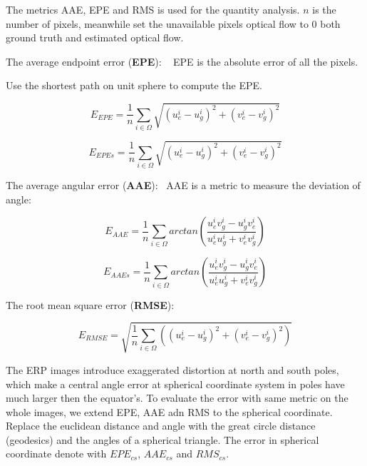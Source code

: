 The metrics AAE, EPE and RMS is used for the quantity analysis.
$n$ is the number of pixels, meanwhile set the unavailable pixels optical flow to 0 both ground truth and estimated optical flow.

The average endpoint error (\textbf{EPE}):  ~\cite{BakerSLRBS2011}
EPE is the absolute error of all the pixels.

Use the shortest path on unit sphere to compute the EPE.

\begin{equation}\label{equ_exp_epe}
	E_{EPE} = \frac{1}{n} \sum_{i \in \Omega}\sqrt{(u_e^i - u_g^i)^2 + (v_e^i - v_g^i)^2}
\end{equation}

\begin{equation}\label{equ_exp_epe_sp}
	E_{EPEs} = \frac{1}{n} \sum_{i \in \Omega}\sqrt{(u_e^i - u_g^i)^2 + (v_e^i - v_g^i)^2}
\end{equation}

The average angular error (\textbf{AAE}):~\cite{??}
AAE is a metric to measure the deviation of angle:

\begin{equation}\label{equ_exp_aae}
	E_{AAE} = \frac{1}{n} \sum_{i \in \Omega}arctan(\frac{u^i_e v^i_g - u^i_g v^i_e}{u^i_e u^i_g + v^i_e v^i_g})
\end{equation}

\begin{equation}\label{equ_exp_aae_sp}
	E_{AAEs} = \frac{1}{n} \sum_{i \in \Omega}arctan(\frac{u^i_e v^i_g - u^i_g v^i_e}{u^i_e u^i_g + v^i_e v^i_g})
\end{equation}

The root mean square error (\textbf{RMSE}):~\cite{??}


\begin{equation}\label{equ_exp_rmse}
	E_{RMSE} = \sqrt{\frac{1}{n} \sum_{i \in \Omega}((u_e^i - u_g^i)^2 + (v_e^i - v_g^i)^2)}
\end{equation}

The ERP images introduce exaggerated distortion at north and south poles, which make a central angle error at spherical coordinate system in poles have much larger then the equator's.
To evaluate the error with same metric on the whole images, we extend EPE, AAE adn RMS to the spherical coordinate. 
Replace the euclidean distance and angle with the great circle distance (geodesics) and the angles of a spherical triangle. 
The error in spherical coordinate denote with $EPE_{cs}$, $AAE_{cs}$ and $RMS_{cs}$.


